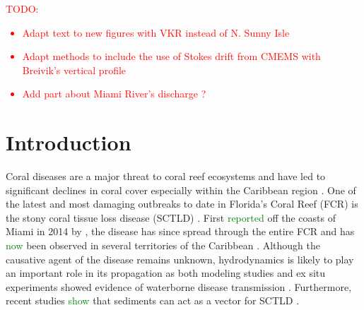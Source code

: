 \documentclass[preprint,12pt,authoryear]{elsarticle}
\newcommand{\todo}[1]{\textcolor{red}{TODO: #1}}
\newcommand{\modif}[1]{\textcolor{green}{#1}}
\begin{document}
\linenumbers

\todo{
\begin{itemize}
    \item Adapt text to new figures with VKR instead of N. Sunny Isle
    \item Adapt methods to include the use of Stokes drift from CMEMS with Breivik's vertical profile
    \item Add part about Miami River's discharge ?
\end{itemize}
}

\section{Introduction}

Coral diseases are a major threat to coral reef ecosystems and have led to significant declines in coral cover especially within the Caribbean region \citep{richardson1998coral, sutherland2004disease, aronson2001white, harvell2007coral, brandt2009dynamics}. One of the latest and most damaging outbreaks to date in Florida's Coral Reef (FCR) is the stony coral tissue loss disease (SCTLD) \citep{noaa2018}. First \modif{reported} off the coasts of Miami in 2014 by \cite{precht2016unprecedented}, the disease has since spread through the entire FCR \citep{muller2020spatial,dobbelaere2022connecting} and has \modif{now} been observed in several territories of the Caribbean \citep{kramer2019map, meiling2021variable, estrada2021effects,heres2021ecological}. Although the causative agent of the disease remains unknown, hydrodynamics is likely to play an important role in its propagation as both modeling studies and ex situ experiments showed evidence of waterborne disease transmission \citep{aeby2019pathogenesis,dobbelaere2020coupled,eaton2021measuring, meiling2021variable}. Furthermore, recent studies \modif{show} that sediments can act as  a vector for SCTLD \citep{rosales2020rhodobacterales, studivan2022reef}.
\end{document}
